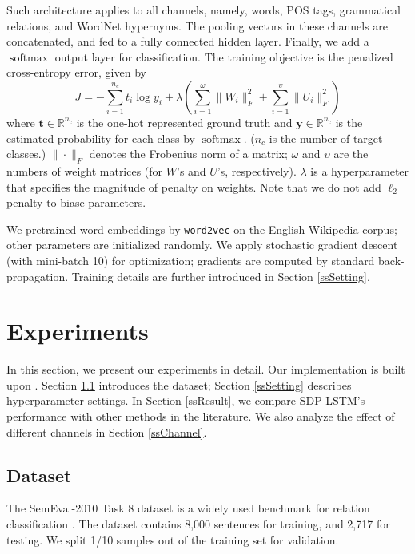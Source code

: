 \documentclass[11pt,a4paper]{article}
\begin{document}
Such architecture applies to all channels, namely, words, POS tags, grammatical relations,
and WordNet hypernyms. The pooling vectors in these channels
are concatenated, and fed to a fully connected hidden layer.
Finally, we add a $\operatorname{softmax}$ output layer for classification.
The training objective is the penalized cross-entropy error, given by
$$J=-\sum_{i=1}^{n_c} t_i\log y_i+\lambda\!\left(\sum_{i=1}^\omega\|W_i\|_F^2+
\sum_{i=1}^{\upsilon}\|U_i\|_F^2\!\right)$$
where $\bm t\in\mathbb{R}^{n_c}$ is the one-hot represented ground truth and
$\bm y\in\mathbb{R}^{n_c}$
is the estimated probability for each class by $\operatorname{softmax}$.
(${n_c}$ is the number of target classes.)
$\|\cdot\|_F$ denotes the Frobenius norm of a matrix; $\omega$ and $\upsilon$
are the numbers of weight matrices (for $W$'s and $U$'s, respectively).
$\lambda$ is a hyperparameter that specifies the magnitude of penalty on weights.
Note that we do not add $\ell_2$ penalty to biase parameters.

We pretrained word embeddings by \verb|word2vec| \cite{Word2vce}
on the English Wikipedia corpus;
other parameters are initialized randomly.
We apply stochastic gradient descent (with mini-batch 10)
for optimization; gradients are computed by standard back-propagation.
Training details are further introduced in Section \ref{ssSetting}.

\section{Experiments}\label{sExperiment}



In this section, we present our experiments in detail.
Our implementation is built upon .
Section \ref{ssData} introduces the dataset;
Section \ref{ssSetting} describes hyperparameter settings.
In Section \ref{ssResult}, we compare
SDP-LSTM's performance with other methods in the literature.
We also analyze the effect of different channels in Section \ref{ssChannel}.


\subsection{Dataset}\label{ssData}

The SemEval-2010 Task 8 dataset is a widely used benchmark for
relation classification \cite{2010SVM}. The dataset contains 8,000 sentences for training, and 2,717 for testing.
We split 1/10 samples out of the training set for validation.
\end{document}
